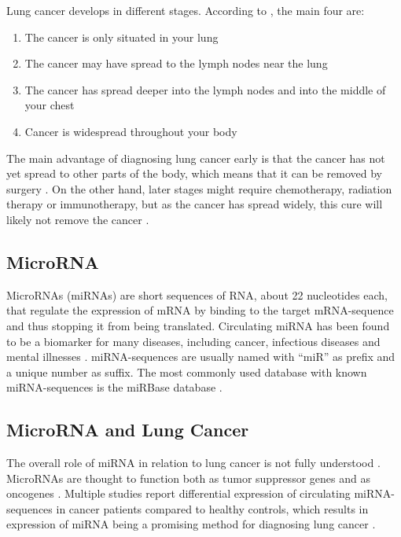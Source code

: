 Lung cancer develops in different stages. According to \citet{cancerstages}, the main four are:
\begin{enumerate}
    \item The cancer is only situated in your lung
    \item The cancer may have spread to the lymph nodes near the lung
    \item The cancer has spread deeper into the lymph nodes and into the middle of your chest
    \item Cancer is widespread throughout your body
\end{enumerate}

The main advantage of diagnosing lung cancer early is that the cancer has not yet spread to other parts of the body, which means that it can be removed by surgery \citep{cancertreatment}. On the other hand, later stages might require chemotherapy, radiation therapy or immunotherapy, but as the cancer has spread widely, this cure will likely not remove the cancer \citep{cancertreatment}.


\subsection{MicroRNA}

MicroRNAs (miRNAs) are short sequences of RNA, about 22 nucleotides each, that regulate the expression of mRNA by binding to the target mRNA-sequence and thus stopping it from being translated. Circulating miRNA has been found to be a biomarker for many diseases, including cancer, infectious diseases and mental illnesses \citep{mirnabiomarker,mirnabiomarker2,mirnabiomarker3,mirnabiomarker4}. miRNA-sequences are usually named with ``miR'' as prefix and a unique number as suffix. The most commonly used database with known miRNA-sequences is the miRBase database \citep{mirbase}.

\subsection{MicroRNA and Lung Cancer}

The overall role of miRNA in relation to lung cancer is not fully understood \citep{mirnarole}. MicroRNAs are thought to function both as tumor suppressor genes and as oncogenes \citep{mirnarole2}. Multiple studies report differential expression of circulating miRNA-sequences in cancer patients compared to healthy controls, which results in expression of miRNA being a promising method for diagnosing lung cancer \citep{mirnarole}.


